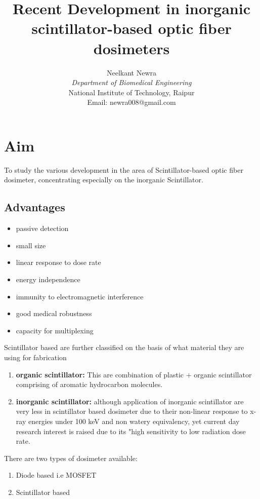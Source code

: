 \documentclass{article}
\title{\textbf{Recent Development in inorganic scintillator-based optic fiber dosimeters}}
\author{Neelkant Newra \\ \textit{Department of Biomedical Engineering} \\ National Institute of Technology, Raipur \\ Email: newra008@gmail.com}
\begin{document}
\maketitle


\section*{Aim}
To study the various development in the area of Scintillator-based optic fiber dosimeter, concentrating especially on the inorganic Scintillator. 
\\

\begin{multicols}{2}

\subsection{Advantages}
\begin{itemize}
    
    \item passive detection
    \item small size
    \item linear response to dose rate
    \item energy independence 
    \item immunity to electromagnetic interference 
    \item good medical robustness
    \item capacity for multiplexing 
    
\end{itemize}

\noindent Scintillator based are further classified on the basis of what material they are using for fabrication
\begin{enumerate}
    \item \textbf{organic scintillator:} This are combination of plastic + organic scintillator comprising of aromatic hydrocarbon molecules.
    \item \textbf{inorganic scintillator:} although application of inorganic scintillator are very less in scintillator based dosimeter due to their non-linear response to x-ray energies under 100 keV and non watery equivalency, yet current day research interest is raised due to its "high sensitivity to low  radiation dose rate.
\end{enumerate}

\noindent There are two types of dosimeter available:
\begin{enumerate}
    \item Diode based i.e MOSFET
    \item Scintillator based
\end{enumerate}


\end{multicols}
\end{document}
